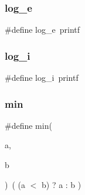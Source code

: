 \mbox{\label{mpu_8h_ab354affc295f7d61fe8a355c9361cc5a}} 
\subsubsection{log\+\_\+e}
{\footnotesize\ttfamily \#define log\+\_\+e~printf}

\mbox{\label{mpu_8h_a2905fba7885cd95057e1655cb4d16bda}} 
\subsubsection{log\+\_\+i}
{\footnotesize\ttfamily \#define log\+\_\+i~printf}

\mbox{\label{mpu_8h_ac6afabdc09a49a433ee19d8a9486056d}} 
\subsubsection{min}
{\footnotesize\ttfamily \#define min(\begin{DoxyParamCaption}\item[{}]{a,  }\item[{}]{b }\end{DoxyParamCaption})~( (a $<$ b) ? a \+: b )}

